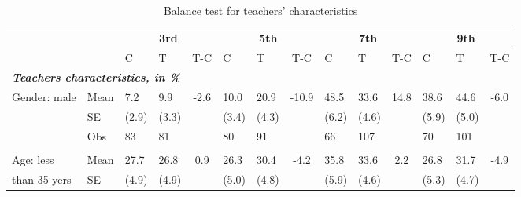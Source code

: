 \documentclass[
	article,			%
	12pt,				%
	oneside,			%
	a4paper,			%
	]{article}
\begin{document}
\begin{table}[h!]
\centering
\fontsize{8}{11} \selectfont
\caption{Balance test for teachers' characteristics}
    \begin{tabular}{lp{2.335em}p{1.915em}p{2.085em}cp{1.915em}p{1.915em}cp{1.915em}p{1.915em}cp{1.915em}p{1.915em}c}
\hline
\hline
           &            &             \multicolumn{ 3}{c}{3rd} &             \multicolumn{ 3}{c}{5th} &             \multicolumn{ 3}{c}{7th} &             \multicolumn{ 3}{c}{9th} \\
\hline
           & {\it {\bf }} &          C &          T &        T-C &          C &          T &        T-C &          C &          T &        T-C &          C &          T &        T-C \\

                                                                                                                  \multicolumn{ 14}{l}{{\it {\bf Teachers characteristics, in \%}}} \\


Gender: male &       Mean &        7.2 &        9.9 &       -2.6 &       10.0 &       20.9 &     -10.9 &       48.5 &       33.6 &      14.8 &       38.6 &       44.6 &       -6.0 \\

           &         SE &      (2.9) &      (3.3) &            &      (3.4) &      (4.3) &            &      (6.2) &      (4.6) &            &      (5.9) &      (5.0) &            \\

           &        Obs &         83 &         81 &            &         80 &         91 &            &         66 &        107 &            &         70 &        101 &            \\

           &            &            &            &            &            &            &            &            &            &            &            &            &            \\

Age: less  &       Mean &       27.7 &       26.8 &        0.9 &       26.3 &       30.4 &       -4.2 &       35.8 &       33.6 &        2.2 &       26.8 &       31.7 &       -4.9 \\

than 35 yers &         SE &      (4.9) &      (4.9) &            &      (5.0) &      (4.8) &            &      (5.9) &      (4.6) &            &      (5.3) &      (4.7) &            \\


\end{tabular}
\end{table}
\end{document}
